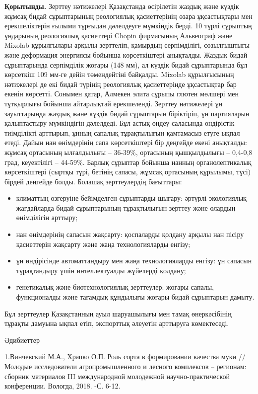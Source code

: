 {{{\bfseries Қорытынды.} Зерттеу нәтижелері Қазақстанда өсірілетін жаздық
және күздік жұмсақ бидай сұрыптарының реологиялық қасиеттерінің өзара
ұқсастықтары мен ерекшеліктерін ғылыми тұрғыдан дәлелдеуге мүмкіндік
берді. 10 түрлі сұрыптың ұндарының реологиялық қасиеттері Chopin
фирмасының Альвеограф және Mixolab құрылғылары арқылы зерттеліп,
қамырдың серпімділігі, созылғыштығы және деформация энергиясы бойынша
көрсеткіштері анықталды. Жаздық бидай сұрыптарында серпімділік жоғары
(148 мм), ал күздік бидай сұрыптарында бұл көрсеткіш 109 мм-ге дейін
төмендейтіні байқалды. Mixolab құрылғысының нәтижелері де екі бидай
түрінің реологиялық қасиеттерінде ұқсастықтар бар екенін көрсетті.
Сонымен қатар, Алмекен элита сұрыпы глютен мөлшері мен тұтқырлығы
бойынша айтарлықтай ерекшеленді. Зерттеу нәтижелері ұн зауыттарында
жаздық және күздік бидай сұрыптарын біріктіріп, ұн партияларын
қалыптастыру мүмкіндігін дәлелдеді. Бұл астық өңдеу саласында өндірістік
тиімділікті арттырып, ұнның сапалық тұрақтылығын қамтамасыз етуге ықпал
етеді. Дайын нан өнімдерінің сапа көрсеткіштері бір деңгейде екені
анықталды: жұмсақ ортасының ылғалдылығы -- 36-39\%, ортасының
қышқылдылығы -- 0,4-0,8 град, кеуектілігі -- 44-59\%. Барлық сұрыптар
бойынша нанның органолептикалық көрсеткіштері (сыртқы түрі, бетінің
сапасы, жұмсақ ортасының құрылымы, түсі) бірдей деңгейде болды. Болашақ
зерттеулердің бағыттары:

\begin{itemize}
\item
  климаттың өзгеруіне бейімделген сұрыптарды шығару: әртүрлі экологиялық
  жағдайларда бидай сұрыптарының тұрақтылығын зерттеу және олардың
  өнімділігін арттыру;
\item
  нан өнімдерінің сапасын жақсарту: қоспаларды қолдану арқылы нан пісіру
  қасиеттерін жақсарту және жаңа технологияларды енгізу;
\item
  ұн өндірісінде автоматтандыру мен жаңа технологияларды енгізу: ұн
  сапасын тұрақтандыру үшін интеллектуалды жүйелерді қолдану;
\item
  генетикалық және биотехнологиялық зерттеулер: жоғары сапалы,
  функционалды және тағамдық құндылығы жоғары бидай сұрыптарын дамыту.
\end{itemize}

Бұл зерттеулер Қазақстанның ауыл шаруашылығы мен тамақ өнеркәсібінің
тұрақты дамуына ықпал етіп, экспорттық әлеуетін арттыруға көмектеседі.

Әдибиеттер

1.Винчевский М.А., Храпко О.П. Роль сорта в формировании качества муки
// Молодые исследователи агропромышленного и лесного комплексов --
регионам: сборник материалов III международной молодежной
научно-практической конференции. Вологда, 2018. -С. 6-12.

}}
